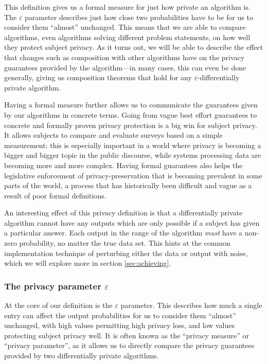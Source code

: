 \documentclass[a4paper,12pt]{article}
\renewcommand{\epsilon}{\varepsilon}
\begin{document}
This definition gives us a formal measure for just how private an algorithm is. The $\epsilon$ parameter describes just how close two probabilities have to be for us to consider them ``almost'' unchanged. This means that we are able to compare algorithms, even algorithms solving different problem statements, on how well they protect subject privacy. As it turns out, we will be able to describe the effect that changes such as composition with other algorithms have on the privacy guarantees provided by the algorithm---in many cases, this can even be done generally, giving us composition theorems that hold for any $\epsilon$-differentially private algorithm.

Having a formal measure further allows us to communicate the guarantees given by our algorithms in concrete terms. Going from vague best effort guarantees to concrete and formally proven privacy protection is a big win for subject privacy. It allows subjects to compare and evaluate surveys based on a simple measurement; this is especially important in a world where privacy is becoming a bigger and bigger topic in the public discourse, while systems processing data are becoming more and more complex. Having formal guarantees also helps the legislative enforcement of privacy-preservation that is becoming prevalent in some parts of the world, a process that has historically been difficult and vague as a result of poor formal definitions.

An interesting effect of this privacy definition is that a differentially private algorithm cannot have any outputs which are only possible if a subject has given a particular answer. Each output in the range of the algorithm \emph{must} have a non-zero probability, no matter the true data set. This hints at the common implementation technique of perturbing either the data or output with noise, which we will explore more in section \ref{sec:achieving}.

\subsubsection{The privacy parameter $\epsilon$ \label{sec:epsilon}}

At the core of our definition is the $\epsilon$ parameter. This describes how much a single entry can affect the output probabilities for us to consider them ``almost'' unchanged, with high values permitting high privacy loss, and low values protecting subject privacy well. It is often known as the ``privacy measure'' or ``privacy parameter'', as it allows us to directly compare the privacy guarantees provided by two differentially private algorithms.
\end{document}
